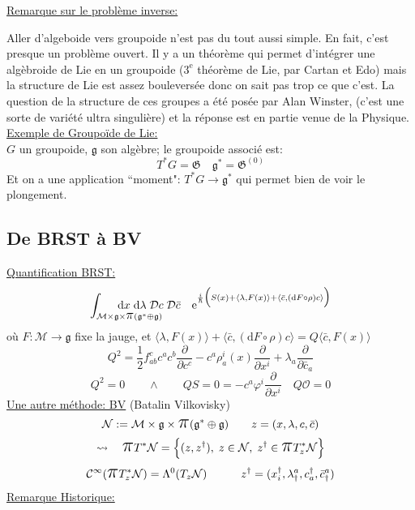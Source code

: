 \documentclass[a4paper,11pt]{article}
\renewcommand{\d}{{\mathrm{d}}}
\newcommand{\D}{{\mathcal{D}}}
\newcommand{\e}{{\mathrm{e}}}
\newcommand{\dr}[2]{\frac{\partial {#1}}{\partial{#2}}}
\newcommand{\ppi}{{\mathlarger{\mathlarger{\mathlarger{\pi}}}}}
\begin{document}
\noindent\underline{Remarque sur le problème inverse:}

Aller d'algeboide vers groupoide n'est pas du tout aussi simple. En fait, c'est presque un problème ouvert. Il y a un théorème qui permet d'intégrer une algèbroide de Lie en un groupoide ($3^\e$ théorème de Lie, par Cartan et Edo) mais la structure de Lie est assez bouleversée donc on sait pas trop ce que c'est. La question de la structure de ces groupes a été posée par Alan Winster, (c'est une sorte de variété ultra singulière) et la réponse est en partie venue de la Physique.\\

\noindent\underline{Exemple de Groupoïde de Lie:}\\
$G$ un groupoide, $\mathfrak{g}$ son algèbre; le groupoide associé est:
$$T^*G = \mathfrak{G} \quad \mathfrak{g}^*=\mathfrak{G}^{(0)}$$
Et on a une application ``moment": $T^*G \to \mathfrak{g}^*$ qui permet bien de voir le plongement.

\subsection{De BRST à BV}
\underline{Quantification BRST:}
$$\int_{\mathcal M \times \mathfrak g \times \ppi(\mathfrak g^* \oplus \mathfrak g)}\!\!\!\!\!\!\!\!\!\!\!\!\!\!\!\!\!\!\!\!\!\!\!\!\!\d x\; \d\lambda\; \D c\; \D\bar c \quad \e^{\frac i\hbar \Big(S(x)+\langle\lambda,F(x)\rangle+\langle\bar c, (\d F\circ \rho) c\rangle\Big)}$$
où $F:\mathcal{M}\to\mathfrak g$ fixe la jauge, et $\langle\lambda,F(x)\rangle+\langle\bar c, (\d F\circ \rho) c\rangle = Q\langle\bar c, F(x)\rangle$
$$Q^2 = \frac12 f^c_{ab}c^ac^b\dr{}{c^c} - c^a\rho^i_a(x) \dr{}{x^i}+\lambda_a \dr{}{\bar c_a}$$
$$Q^2 = 0 \quad \quad \wedge \quad \quad QS=0=-c^a\varphi^i\dr{}{x^i} \quad Q\mathcal{O}=0$$
\underline{Une autre méthode: BV} (Batalin Vilkovisky)
$$\mathcal N := \mathcal{M}\times\mathfrak g \times \ppi(\mathfrak g^* \oplus \mathfrak g) \quad \quad z=(x,\lambda,c,\bar c)$$
$$\rightsquigarrow \quad \ppi T^*\mathcal N = \Big\{ (z,z^\dag), \; z\in\mathcal N, \; z^\dag\in\ppi T^*_z\mathcal N\Big\}$$
$$\mathcal C^\infty (\ppi T^*_z\mathcal N) = \Lambda^0 (T_z\mathcal N) \quad \quad \quad
z^\dag = (x_i^\dag, \lambda^a_\dag, c_a^\dag, \bar c_\dag^a)$$
\underline{Remarque Historique:}
\end{document}
